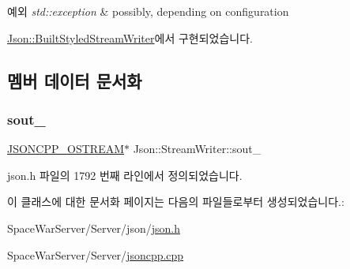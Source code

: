 \begin{DoxyExceptions}{예외}
{\em std\+::exception} & possibly, depending on configuration \\
\hline
\end{DoxyExceptions}


\hyperlink{struct_json_1_1_built_styled_stream_writer_a823cdb1afabb6b0d5f39bcd5a6a6f747}{Json\+::\+Built\+Styled\+Stream\+Writer}에서 구현되었습니다.



\subsection{멤버 데이터 문서화}
\mbox{\label{class_json_1_1_stream_writer_a4f5603d4228a9fa46a42cb44e5234d9b}} 
\subsubsection{\texorpdfstring{sout\+\_\+}{sout\_}}
{\footnotesize\ttfamily \hyperlink{json_8h_a37a25be5fca174927780caeb280094ce}{J\+S\+O\+N\+C\+P\+P\+\_\+\+O\+S\+T\+R\+E\+AM}$\ast$ Json\+::\+Stream\+Writer\+::sout\+\_\+\hspace{0.3cm}{\ttfamily [protected]}}



json.\+h 파일의 1792 번째 라인에서 정의되었습니다.



이 클래스에 대한 문서화 페이지는 다음의 파일들로부터 생성되었습니다.\+:\begin{DoxyCompactItemize}
\item 
Space\+War\+Server/\+Server/json/\hyperlink{json_8h}{json.\+h}\item 
Space\+War\+Server/\+Server/\hyperlink{jsoncpp_8cpp}{jsoncpp.\+cpp}\end{DoxyCompactItemize}
